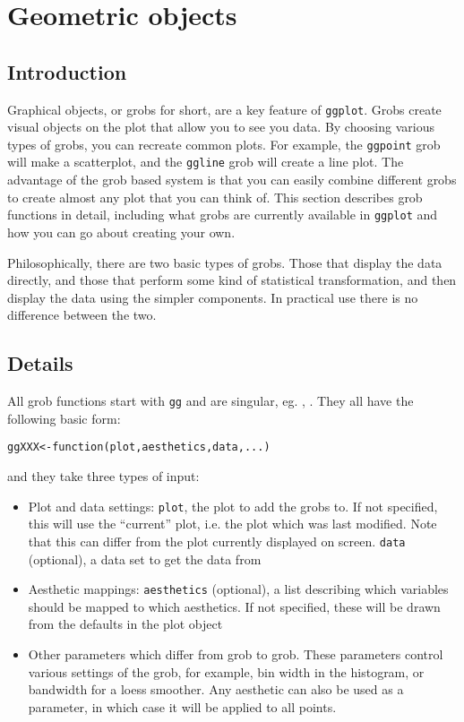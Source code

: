 

\chapter{Geometric objects}

\section{Introduction}\label{sec:introduction}

Graphical objects, or grobs for short, are a key feature of {\tt ggplot}.  Grobs create visual objects on the plot that allow you to see you data.  By choosing various types of grobs, you can recreate common plots.  For example, the {\tt ggpoint} grob will make a scatterplot, and the {\tt ggline} grob will create a line plot.  The advantage of the grob based system is that you can easily combine different grobs to create almost any plot that you can think of.  This section describes grob functions in detail, including what grobs are currently available in {\tt ggplot} and how you can go about creating your own.

Philosophically, there are two basic types of grobs.  Those that display the data directly, and those that perform some kind of statistical transformation, and then display the data using the simpler components.  In practical use there is no difference between the two.
 
\section{Details}\label{sec:details}

All grob functions start with {\tt gg} and are singular, eg. , .  They all have the following basic form:

\begin{alltt}
ggXXX <- function(plot, aesthetics, data, ...) {}
\end{alltt}

\noindent and they take three types of input:

\begin{itemize}
	\item Plot and data settings: {\tt plot}, the plot to add the grobs to. If not specified, this will use the ``current'' plot, i.e. the plot which was last modified. Note that this can differ from the plot currently displayed on screen.  {\tt data} (optional), a data set to get the data from
	\item Aesthetic mappings: {\tt aesthetics} (optional), a list describing which variables should be mapped to which aesthetics.  If not specified, these will be drawn from the defaults in the plot object
	\item Other parameters which differ from grob to grob.  These parameters control various settings of the grob, for example, bin width in the histogram, or bandwidth for a loess smoother.  Any aesthetic can also be used as a parameter, in which case it will be applied to all points.
\end{itemize}

